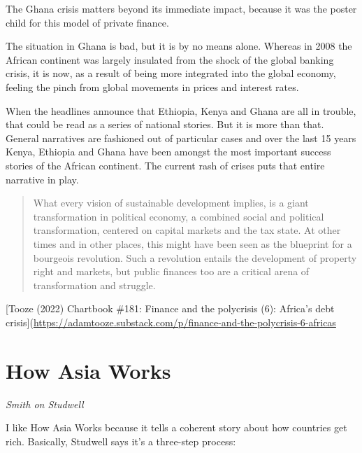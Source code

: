 \documentclass[
]{book}
\begin{document}
The Ghana crisis matters beyond its immediate impact, because it was the poster child for this model of private finance.

The situation in Ghana is bad, but it is by no means alone. Whereas in 2008 the African continent was largely insulated from the shock of the global banking crisis, it is now, as a result of being more integrated into the global economy, feeling the pinch from global movements in prices and interest rates.

When the headlines announce that Ethiopia, Kenya and Ghana are all in trouble, that could be read as a series of national stories. But it is more than that. General narratives are fashioned out of particular cases and over the last 15 years Kenya, Ethiopia and Ghana have been amongst the most important success stories of the African continent. The current rash of crises puts that entire narrative in play.

\begin{quote}
What every vision of sustainable development implies, is a giant transformation in political economy, a combined social and political transformation, centered on capital markets and the tax state. At other times and in other places, this might have been seen as the blueprint for a bourgeois revolution. Such a revolution entails the development of property right and markets, but public finances too are a critical arena of transformation and struggle.
\end{quote}

{[}Tooze (2022) Chartbook \#181: Finance and the polycrisis (6): Africa's debt crisis{]}(\url{https://adamtooze.substack.com/p/finance-and-the-polycrisis-6-africas}

\hypertarget{how-asia-works}{%
\section{How Asia Works}\label{how-asia-works}}

\emph{Smith on Studwell}

I like How Asia Works because it tells a coherent story about how countries get rich. Basically, Studwell says it's a three-step process:
\end{document}
